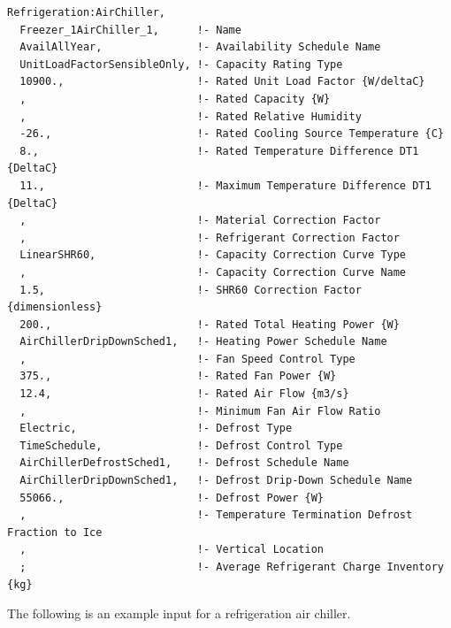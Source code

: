 \begin{lstlisting}
Refrigeration:AirChiller,
  Freezer_1AirChiller_1,      !- Name
  AvailAllYear,               !- Availability Schedule Name
  UnitLoadFactorSensibleOnly, !- Capacity Rating Type
  10900.,                     !- Rated Unit Load Factor {W/deltaC}
  ,                           !- Rated Capacity {W}
  ,                           !- Rated Relative Humidity
  -26.,                       !- Rated Cooling Source Temperature {C}
  8.,                         !- Rated Temperature Difference DT1 {DeltaC}
  11.,                        !- Maximum Temperature Difference DT1 {DeltaC}
  ,                           !- Material Correction Factor
  ,                           !- Refrigerant Correction Factor
  LinearSHR60,                !- Capacity Correction Curve Type
  ,                           !- Capacity Correction Curve Name
  1.5,                        !- SHR60 Correction Factor {dimensionless}
  200.,                       !- Rated Total Heating Power {W}
  AirChillerDripDownSched1,   !- Heating Power Schedule Name
  ,                           !- Fan Speed Control Type
  375.,                       !- Rated Fan Power {W}
  12.4,                       !- Rated Air Flow {m3/s}
  ,                           !- Minimum Fan Air Flow Ratio
  Electric,                   !- Defrost Type
  TimeSchedule,               !- Defrost Control Type
  AirChillerDefrostSched1,    !- Defrost Schedule Name
  AirChillerDripDownSched1,   !- Defrost Drip-Down Schedule Name
  55066.,                     !- Defrost Power {W}
  ,                           !- Temperature Termination Defrost Fraction to Ice
  ,                           !- Vertical Location
  ;                           !- Average Refrigerant Charge Inventory {kg}
\end{lstlisting}

The following is an example input for a refrigeration air chiller.

